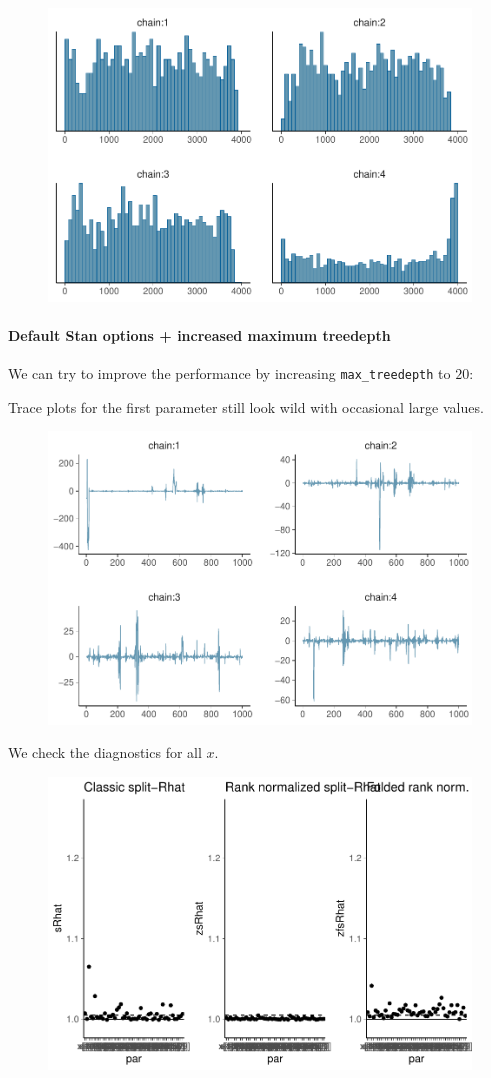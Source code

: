 \documentclass[american,]{article}
\let\oldparagraph\paragraph
\renewcommand{\paragraph}[1]{\oldparagraph{#1}\mbox{}}
\begin{document}
\begin{figure}[tp]
  \centering
  \includegraphics[width=0.6\linewidth]{graphics/hist-fit-nom-2-1.pdf}
\end{figure}

\hypertarget{default-stan-options-increased-maximum-treedepth}{%
\paragraph{Default Stan options + increased maximum
treedepth}\label{default-stan-options-increased-maximum-treedepth}}

We can try to improve the performance by increasing
\texttt{max\_treedepth} to \(20\):

Trace plots for the first parameter still look wild with occasional
large values.

\begin{figure}[tp]
  \centering
  \includegraphics[width=0.6\linewidth]{graphics/trace-fit-nom-td20-1.pdf}
\end{figure}

We check the diagnostics for all \(x\).

\begin{figure}[tp]
  \centering
  \includegraphics[width=0.6\linewidth]{graphics/rhat-fit-nom-td20-1.pdf}
\end{figure}
\end{document}
